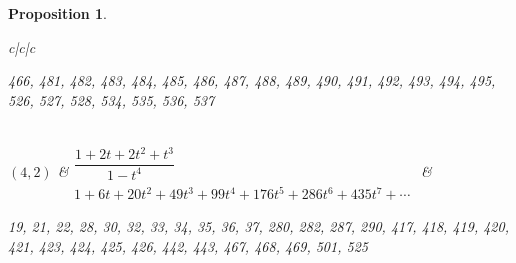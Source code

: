 \documentclass[pdftex]{sigma}%
\newtheorem{prop}[thm]{Proposition}
\theoremstyle{definition}
\numberwithin{equation}{section}
\begin{document}
\begin{prop}
\begin{table}[h!]
\begin{tabu}{c|c|c}
\begin{minipage}{4cm}
 466, 481, 482, 483, 484, 485, 486, 487, 488, 489,
 490, 491, 492, 493, 494, 495, 526, 527, 528, 534,
 535, 536, 537
 \end{minipage}
\\
\hline
$(4,2)$\label{T(2,4)}
&$\begin{array}{c}
	 \dfrac{1+2t+2t^2+t^3}{1-t^4} \\[10pt]
	 {1+6t+20t^2+49t^3+99t^4+176t^5+286t^6+435t^7+\cdots}
\end{array}$
& \begin{minipage}{4cm} \rm
 19, 21, 22, 28, 30, 32, 33, 34, 35, 36,
	 37, 280, 282, 287, 290, 417, 418, 419, 420, 421,
	 423, 424, 425, 426, 442, 443, 467, 468, 469, 501,
	 525
 \end{minipage}
\\
\hline
\end{tabu}%
\end{table}


\end{prop}
\end{document}
